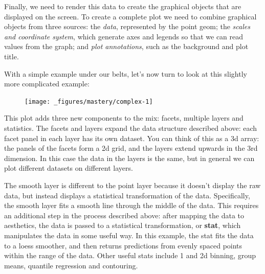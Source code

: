 Finally, we need to render this data to create the graphical objects
that are displayed on the screen. To create a complete plot we need to
combine graphical objects from three sources: the \emph{data},
represented by the point geom; the \emph{scales and coordinate system},
which generate axes and legends so that we can read values from the
graph; and \emph{plot annotations}, such as the background and plot
title.


With a simple example under our belts, let's now turn to look at this
slightly more complicated example:

\begin{Shaded}
\begin{Highlighting}[]
\StringTok{ }
\StringTok{  }\NormalTok{() +}
\StringTok{  }\NormalTok{() +}\StringTok{ }
\StringTok{  }
\end{Highlighting}
\end{Shaded}

\begin{figure}[H]
  \centering
  \texttt{[image: \_figures/mastery/complex-1]}
\end{figure}

This plot adds three new components to the mix: facets, multiple layers
and statistics. The facets and layers expand the data structure
described above: each facet panel in each layer has its own dataset. You
can think of this as a 3d array: the panels of the facets form a 2d
grid, and the layers extend upwards in the 3rd dimension. In this case
the data in the layers is the same, but in general we can plot different
datasets on different layers.

The smooth layer is different to the point layer because it doesn't
display the raw data, but instead displays a statistical transformation
of the data. Specifically, the smooth layer fits a smooth line through
the middle of the data. This requires an additional step in the process
described above: after mapping the data to aesthetics, the data is
passed to a statistical transformation, or \textbf{stat}, which
manipulates the data in some useful way. In this example, the stat fits
the data to a loess smoother, and then returns predictions from evenly
spaced points within the range of the data. Other useful stats include 1
and 2d binning, group means, quantile regression and contouring.

